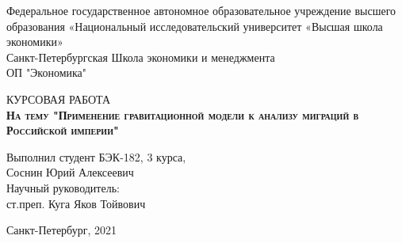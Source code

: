 \begin{center}
	Федеральное государственное автономное образовательное учреждение высшего образования «Национальный исследовательский университет «Высшая школа экономики»
	\\
	\bigskip
	Санкт-Петербургская Школа экономики и менеджмента \\
	ОП "Экономика"
\end{center}

\vspace{8em}

\begin{center}
	{\Large КУРСОВАЯ РАБОТА}\\
	\textsc{\textbf{
			На тему
			\linebreak
			"Применение гравитационной модели к анализу миграций в Российской империи"}}
\end{center}

\vspace{2em}

\hfill\parbox{16cm}{
	\hspace*{5cm}\hspace*{-5cm}Выполнил студент БЭК-182, 3 курса,\\
	Соснин Юрий Алексеевич\\
	
	\hspace*{5cm}\hspace*{-5cm}Научный руководитель:\\
	ст.преп. Куга Яков Тойвович\\
}

\vspace{\fill}

\begin{center}
	Санкт-Петербург, 2021
\end{center}
\thispagestyle{empty}

\clearpage